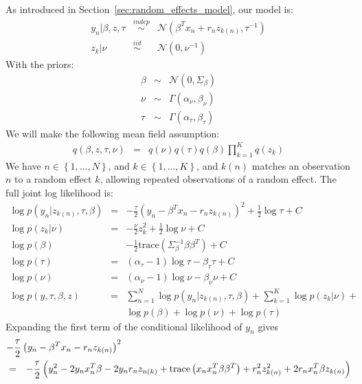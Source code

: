 \documentclass{article}\usepackage[]{graphicx}\usepackage[]{color}
\newcommand{\mysec}[1]{Section~\ref{sec:#1}}
\newcommand{\gauss}{\mathcal{N}} %
\newcommand{\constant}{C} %
\theoremstyle{plain}
\newcommand{\iid}{\stackrel{iid}{\sim}}
\newcommand{\indep}{\stackrel{indep}{\sim}}
\begin{document}
As introduced in \mysec{random_effects_model}, our model is:
%
\begin{eqnarray*}
y_{n}\vert\beta,z,\tau & \indep & \gauss\left(\beta^{T}x_{n}+r_{n}z_{k\left(n\right)},\tau^{-1}\right)\\
z_{k}\vert\nu & \iid & \gauss\left(0,\nu^{-1}\right)
\end{eqnarray*}
%
With the priors:
%
\begin{eqnarray*}
\beta & \sim & \gauss\left(0,\Sigma_{\beta}\right)\\
\nu & \sim & \Gamma\left(\alpha_{\nu},\beta_{\nu}\right)\\
\tau & \sim & \Gamma\left(\alpha_{\tau},\beta_{\tau}\right)
\end{eqnarray*}
%
We will make the following mean field assumption:
%
\begin{eqnarray*}
q\left(\beta,z,\tau,\nu\right) & = & q\left(\nu\right)q\left(\tau\right)q\left(\beta\right)\prod_{k=1}^{K}q\left(z_{k}\right)
\end{eqnarray*}
%
We have $n\in\left\{ 1,...,N\right\} $, and $k\in\left\{ 1,...,K\right\} $,
and $k\left(n\right)$ matches an observation $n$ to a random effect
$k$, allowing repeated observations of a random effect. The full
joint log likelihood is:
%
\begin{eqnarray*}
\log p\left(y_{n}\vert z_{k\left(n\right)},\tau,\beta\right) & = & -\frac{\tau}{2}\left(y_{n}-\beta^{T}x_{n}-r_{n}z_{k\left(n\right)}\right)^{2}+\frac{1}{2}\log\tau+\constant\\
\log p\left(z_{k}\vert\nu\right) & = & -\frac{\nu}{2}z_{k}^{2}+\frac{1}{2}\log\nu+\constant\\
\log p\left(\beta\right) &  & -\frac{1}{2}\textrm{trace}\left(\Sigma_{\beta}^{-1}\beta\beta^{T}\right)+\constant\\
\log p\left(\tau\right) & = & \left(\alpha_{\tau}-1\right)\log\tau-\beta_{\tau}\tau+\constant\\
\log p\left(\nu\right) & = & \left(\alpha_{\nu}-1\right)\log\nu-\beta_{\nu}\nu+\constant\\
\log p\left(y,\tau,\beta,z\right) & = & \sum_{n=1}^{N}\log p\left(y_{n}\vert z_{k\left(n\right)},\tau,\beta\right)+\sum_{k=1}^{K}\log p\left(z_{k}\vert\nu\right)+\\
 &  & \log p\left(\beta\right)+\log p\left(\nu\right)+\log p\left(\tau\right)
\end{eqnarray*}
%
Expanding the first term of the conditional likelihood of $y_{n}$
gives
%
\begin{eqnarray*}
\lefteqn{-\frac{\tau}{2}\left(y_{n}-\beta^{T}x_{n}-r_{n}z_{k\left(n\right)}\right)^{2}}\\
& = & -\frac{\tau}{2}\left(y_{n}^{2}-2y_{n}x_{n}^{T}\beta-2y_{n}r_{n}z_{n\left(k\right)}+\textrm{trace}\left(x_{n}x_{n}^{T}\beta\beta^{T}\right)+r_{n}^{2}z_{k\left(n\right)}^{2}+2r_{n}x_{n}^{T}\beta z_{k\left(n\right)}\right)
\end{eqnarray*}
\end{document}
